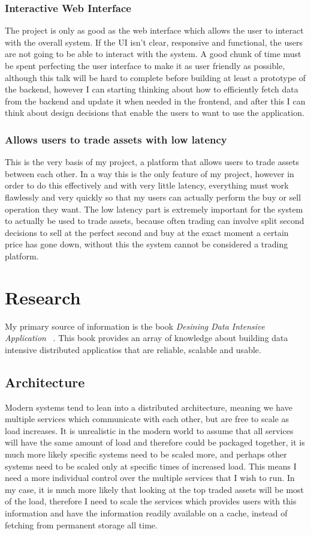 \documentclass[titlepage]{article}
\begin{document}
\subsubsection{Interactive Web Interface}
The project is only as good as the web interface which allows the user to interact with the overall system. If the UI isn't clear, responsive and functional, the users are not going to be able to interact with the system. A good chunk of time must be spent perfecting the user interface to make it as user friendly as possible, although this talk will be hard to complete before building at least a prototype of the backend, however I can starting thinking about how to efficiently fetch data from the backend and update it when needed in the frontend, and after this I can think about design decisions that enable the users to want to use the application.

\subsubsection{Allows users to trade assets with low latency}
This is the very basis of my project, a platform that allows users to trade assets between each other. In a way this is the only feature of my project, however in order to do this effectively and with very little latency, everything must work flawlessly and very quickly so that my users can actually perform the buy or sell operation they want. The low latency part is extremely important for the system to actually be used to trade assets, because often trading can involve split second decisions to sell at the perfect second and buy at the exact moment a certain price has gone down, without this the system cannot be considered a trading platform.

\section{Research}
My primary source of information is the book \textit{Desining Data Intensive Application} ~\cite{kleppmann_2021}. This book provides an array of knowledge about building data intensive distributed applicatios that are reliable, scalable and usable.

\subsection{Architecture}
Modern systems tend to lean into a distributed architecture, meaning we have multiple services which communicate with each other, but are free to scale as load increases. It is unrealistic in the modern world to assume that all services will have the same amount of load and therefore could be packaged together, it is much more likely specific systems need to be scaled more, and perhaps other systems need to be scaled only at specific times of increased load. This means I need a more individual control over the multiple services that I wish to run. In my case, it is much more likely that looking at the top traded assets will be most of the load, therefore I need to scale the services which provides users with this information and have the information readily available on a cache, instead of fetching from permanent storage all time. 
\end{document}
